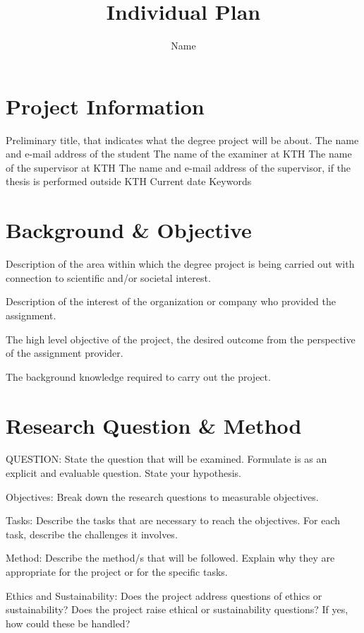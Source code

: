 \documentclass{article}
\title{Individual Plan}
\author{Name}
\begin{document}
\maketitle


\section{Project Information}

Preliminary title, that indicates what the degree project will be about.
The name and e-mail address of the student
The name of the examiner at KTH
The name of the supervisor at KTH
The name and e-mail address of the supervisor, if the thesis is performed outside KTH
Current date
Keywords

\section{Background \& Objective}

Description of the area within which the degree project is being carried out with connection to scientific and/or societal interest.

Description of the interest of the organization or company who provided the assignment.

The high level objective of the project, the desired outcome from the perspective of the assignment provider.

The background knowledge required to carry out the project.

\section{Research Question \& Method}

QUESTION: State the question that will be examined. Formulate is as an explicit and evaluable question. State your hypothesis.

Objectives: Break down the research questions to measurable objectives.

Tasks: Describe the tasks that are necessary to reach the objectives. For each task, describe the challenges it involves.

Method: Describe the method/s that will be followed. Explain why they are appropriate for the project or for the specific tasks.

Ethics and Sustainability: Does the project address questions of ethics or sustainability? Does the project raise ethical or sustainability questions? If yes, how could these be handled?
\end{document}
